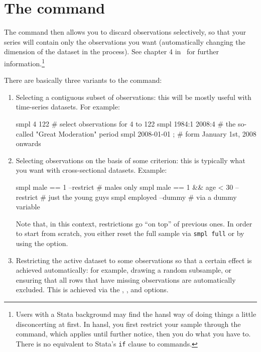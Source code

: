 \section{The  command}

The  command then allows you to discard observations
selectively, so that your series will contain only the observations
you want (automatically changing the dimension of the dataset in the
process). See chapter 4 in \GUG\ for further
information.\footnote{Users with a Stata background may find the hansl
  way of doing things a little disconcerting at first. In hansl, you
  first restrict your sample through the  command, which
  applies until further notice, then you do what you have to. There is
  no equivalent to Stata's \texttt{if} clause to commands.}

There are basically three variants to the  command:
\begin{enumerate}
\item Selecting a contiguous subset of observations: this will be
  mostly useful with time-series datasets. For example:
  \begin{code}
    smpl 4 122            # select observations for 4 to 122
    smpl 1984:1 2008:4    # the so-called "Great Moderation" period
    smpl 2008-01-01 ;     # form January 1st, 2008 onwards
  \end{code}
\item Selecting observations on the basis of some criterion: this is
  typically what you want with cross-sectional datasets. Example:
  \begin{code}
    smpl male == 1 --restrict                # males only
    smpl male == 1 && age < 30 --restrict    # just the young guys
    smpl employed --dummy                    # via a dummy variable
  \end{code}
  Note that, in this context, restrictions go ``on top'' of previous
  ones. In order to start from scratch, you either reset the full
  sample via \texttt{smpl full} or by using the 
  option.
\item Restricting the active dataset to some observations so that a
  certain effect is achieved automatically: for example, drawing a
  random subsample, or ensuring that all rows that have missing
  observations are automatically excluded. This is achieved via the
  , , and 
  options.
\end{enumerate}

